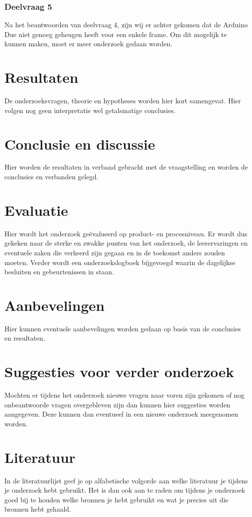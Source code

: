 \documentclass{article}
\begin{document}
\subsubsection{Deelvraag 5}
Na het beantwoorden van deelvraag 4, zijn wij er achter gekomen dat de Arduino Due niet genoeg geheugen heeft voor een enkele frame. Om dit mogelijk te kunnen maken, moet er meer onderzoek gedaan worden.

\section{Resultaten}
De onderzoeksvragen, theorie en hypotheses worden hier kort samengevat. Hier volgen nog geen interpretatie wel getalsmatige conclusies.

\section{Conclusie en discussie}
Hier worden de resultaten in verband gebracht met de vraagstelling en worden de conclusies en verbanden gelegd.

\section{Evaluatie}
Hier wordt het onderzoek geëvalueerd op product- en procesniveau. Er wordt dus gekeken naar de sterke en zwakke punten van het onderzoek, de leerervaringen en eventuele zaken die verkeerd zijn gegaan en in de toekomst anders zouden moeten. Verder wordt een onderzoekslogboek bijgevoegd waarin de dagelijkse besluiten en gebeurtenissen in staan.

\section{Aanbevelingen}
Hier kunnen eventuele aanbevelingen worden gedaan op basis van de conclusies en resultaten.

\section{Suggesties voor verder onderzoek}
Mochten er tijdens het onderzoek nieuwe vragen naar voren zijn gekomen of nog onbeantwoorde vragen overgebleven zijn dan kunnen hier suggesties worden aangegeven. Deze kunnen dan eventueel in een nieuwe onderzoek meegenomen worden.

\section{Literatuur}
In de literatuurlijst geef je op alfabetische volgorde aan welke literatuur je tijdens je onderzoek hebt gebruikt. Het is dan ook aan te raden om tijdens je onderzoek goed bij te houden welke bronnen je hebt gebruikt en wat je precies uit die bronnen hebt gehaald.
\end{document}

